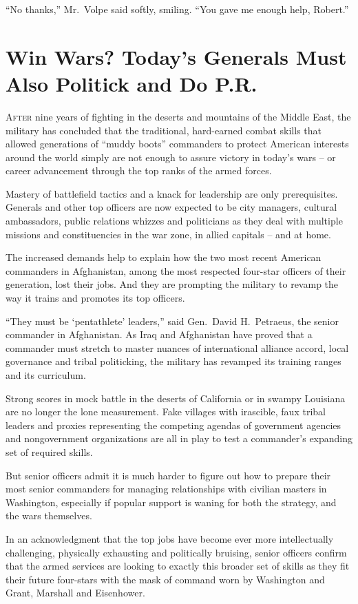 ﻿\documentclass[12pt]{article}
\begin{document}
``No thanks,'' Mr.~Volpe said softly, smiling. ``You gave me enough help, Robert.''

\section{Win Wars? Today's Generals Must Also Politick and Do P.R.}

\lettrine{A}{fter} nine years of fighting in the deserts and mountains of
the Middle East, the military has concluded that the traditional, hard-earned combat skills that
allowed generations of ``muddy boots'' commanders to protect American interests around the world
simply are not enough to assure victory in today's wars -- or career advancement through the top
ranks of the armed forces.

Mastery of battlefield tactics and a knack for leadership are only prerequisites. Generals and other
top officers are now expected to be city managers, cultural ambassadors, public relations whizzes
and politicians as they deal with multiple missions and constituencies in the war zone, in allied
capitals -- and at home.

The increased demands help to explain how the two most recent American commanders in Afghanistan,
among the most respected four-star officers of their generation, lost their jobs. And they are
prompting the military to revamp the way it trains and promotes its top officers.

``They must be `pentathlete' leaders,'' said Gen.~David H.~Petraeus, the senior commander in
Afghanistan. As Iraq and Afghanistan have proved that a commander must stretch to master nuances of
international alliance accord, local governance and tribal politicking, the military has revamped
its training ranges and its curriculum.

Strong scores in mock battle in the deserts of California or in swampy Louisiana are no longer the
lone measurement. Fake villages with irascible, faux tribal leaders and proxies representing the
competing agendas of government agencies and nongovernment organizations are all in play to test a
commander's expanding set of required skills.

But senior officers admit it is much harder to figure out how to prepare their most senior
commanders for managing relationships with civilian masters in Washington, especially if popular
support is waning for both the strategy, and the wars themselves.

In an acknowledgment that the top jobs have become ever more intellectually challenging, physically
exhausting and politically bruising, senior officers confirm that the armed services are looking to
exactly this broader set of skills as they fit their future four-stars with the mask of command worn
by Washington and Grant, Marshall and Eisenhower.
\end{document}
